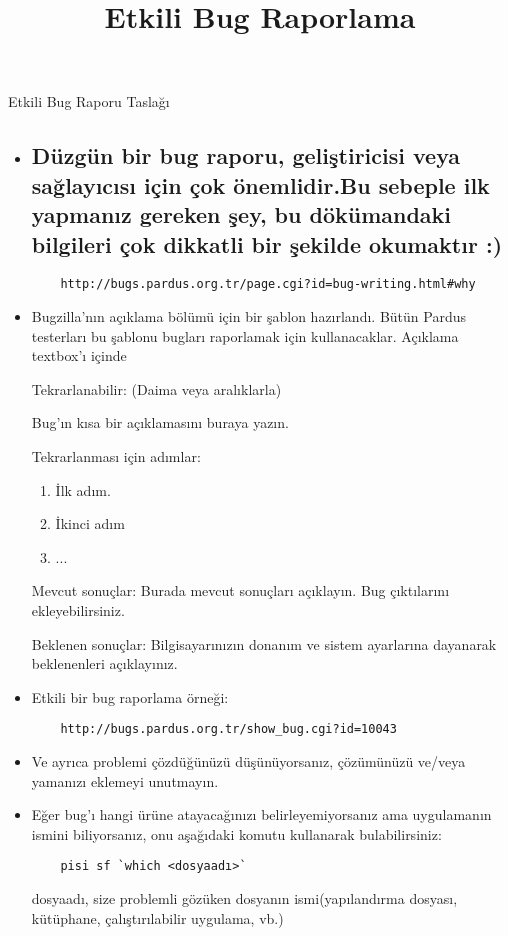 \documentclass[a4paper,10pt]{article}
\title{Etkili Bug Raporlama}
\begin{document}
\maketitle

Etkili Bug Raporu Taslağı

\begin{itemize}
 
  	\item \subsection*{Düzgün bir  bug raporu, geliştiricisi veya sağlayıcısı için çok önemlidir.Bu sebeple ilk yapmanız gereken şey, bu dökümandaki bilgileri çok dikkatli bir şekilde okumaktır :) }
	\begin{verbatim} 
 	http://bugs.pardus.org.tr/page.cgi?id=bug-writing.html#why
	\end{verbatim}

  	\item Bugzilla'nın açıklama bölümü için bir şablon hazırlandı. Bütün Pardus testerları bu şablonu bugları raporlamak için kullanacaklar.
  	Açıklama textbox'ı içinde

   	Tekrarlanabilir: (Daima veya aralıklarla)	
   
    	Bug'ın kısa bir açıklamasını buraya yazın.
   
   	Tekrarlanması için adımlar:
   	\begin{enumerate}
    	\item İlk adım.
    	\item İkinci adım
    	\item ...
   	\end{enumerate}

	Mevcut sonuçlar:
	Burada mevcut sonuçları açıklayın. Bug çıktılarını ekleyebilirsiniz.
	
	Beklenen sonuçlar:
	Bilgisayarınızın donanım ve sistem ayarlarına dayanarak beklenenleri açıklayınız.
	
	\item Etkili bir bug raporlama örneği:
	\begin{verbatim}
	http://bugs.pardus.org.tr/show_bug.cgi?id=10043
	\end{verbatim}
	\item Ve ayrıca problemi çözdüğünüzü düşünüyorsanız, çözümünüzü ve/veya yamanızı eklemeyi unutmayın.

  	\item Eğer bug'ı hangi ürüne atayacağınızı belirleyemiyorsanız ama uygulamanın ismini biliyorsanız, onu aşağıdaki komutu kullanarak bulabilirsiniz:
	\begin{verbatim}
	pisi sf `which <dosyaadı>`
	\end{verbatim}
	dosyaadı, size problemli gözüken dosyanın ismi(yapılandırma dosyası, kütüphane, çalıştırılabilir uygulama, vb.)


\end{itemize}
\end{document}
